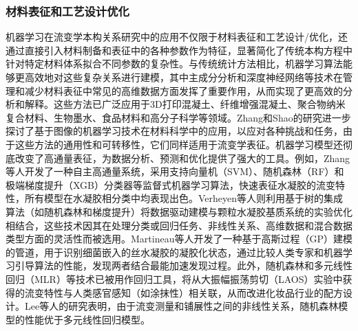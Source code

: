 \subsubsection{材料表征和工艺设计优化}
机器学习在流变学本构关系研究中的应用不仅限于材料表征和工艺设计/优化，还通过直接引入材料制备和表征中的各种参数作为特征，显著简化了传统本构方程中针对特定材料体系拟合不同参数的复杂性。与传统统计方法相比，机器学习算法能够更高效地对这些复杂关系进行建模，其中主成分分析和深度神经网络等技术在管理和减少材料表征中常见的高维数据方面发挥了重要作用，从而实现了更高效的分析和解释。这些方法已广泛应用于3D打印混凝土、纤维增强混凝土、聚合物纳米复合材料、生物墨水、食品材料和高分子科学等领域。Zhang和Shao的研究进一步探讨了基于图像的机器学习技术在材料科学中的应用，以应对各种挑战和任务，由于这些方法的通用性和可转移性，它们同样适用于流变学表征\cite{zhang2022image}。机器学习模型还彻底改变了高通量表征，为数据分析、预测和优化提供了强大的工具。例如，Zhang等人开发了一种自主高通量系统，采用支持向量机（SVM）、随机森林（RF）和极端梯度提升（XGB）分类器等监督式机器学习算法，快速表征水凝胶的流变特性，所有模型在水凝胶相分类中均表现出色\cite{zhangRapidAutonomousHighthroughput2023}。Verheyen等人则利用基于树的集成算法（如随机森林和梯度提升）将数据驱动建模与颗粒水凝胶基质系统的实验优化相结合，这些技术因其在处理分类或回归任务、非线性关系、高维数据和混合数据类型方面的灵活性而被选用\cite{verheyenIntegratedDatadrivenModeling2023}。Martineau等人开发了一种基于高斯过程（GP）建模的管道，用于识别细菌嵌入的丝水凝胶的凝胶化状态，通过比较人类专家和机器学习引导算法的性能，发现两者结合最能加速发现过程\cite{martineauEngineeringGelationKinetics2022}。此外，随机森林和多元线性回归（MLR）等技术已被用作回归工具，将从大振幅振荡剪切（LAOS）实验中获得的流变特性与人类感官感知（如涂抹性）相关联，从而改进化妆品行业的配方设计。Lee等人的研究表明，由于流变测量和铺展性之间的非线性关系，随机森林模型的性能优于多元线性回归模型\cite{lee2022predictive}。

